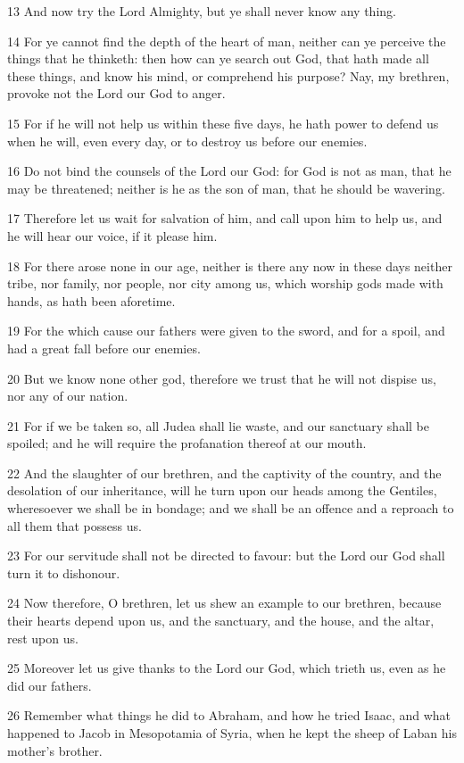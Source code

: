 \par 13 And now try the Lord Almighty, but ye shall never know any thing.
\par 14 For ye cannot find the depth of the heart of man, neither can ye perceive the things that he thinketh: then how can ye search out God, that hath made all these things, and know his mind, or comprehend his purpose? Nay, my brethren, provoke not the Lord our God to anger.
\par 15 For if he will not help us within these five days, he hath power to defend us when he will, even every day, or to destroy us before our enemies.
\par 16 Do not bind the counsels of the Lord our God: for God is not as man, that he may be threatened; neither is he as the son of man, that he should be wavering.
\par 17 Therefore let us wait for salvation of him, and call upon him to help us, and he will hear our voice, if it please him.
\par 18 For there arose none in our age, neither is there any now in these days neither tribe, nor family, nor people, nor city among us, which worship gods made with hands, as hath been aforetime.
\par 19 For the which cause our fathers were given to the sword, and for a spoil, and had a great fall before our enemies.
\par 20 But we know none other god, therefore we trust that he will not dispise us, nor any of our nation.
\par 21 For if we be taken so, all Judea shall lie waste, and our sanctuary shall be spoiled; and he will require the profanation thereof at our mouth.
\par 22 And the slaughter of our brethren, and the captivity of the country, and the desolation of our inheritance, will he turn upon our heads among the Gentiles, wheresoever we shall be in bondage; and we shall be an offence and a reproach to all them that possess us.
\par 23 For our servitude shall not be directed to favour: but the Lord our God shall turn it to dishonour.
\par 24 Now therefore, O brethren, let us shew an example to our brethren, because their hearts depend upon us, and the sanctuary, and the house, and the altar, rest upon us.
\par 25 Moreover let us give thanks to the Lord our God, which trieth us, even as he did our fathers.
\par 26 Remember what things he did to Abraham, and how he tried Isaac, and what happened to Jacob in Mesopotamia of Syria, when he kept the sheep of Laban his mother's brother.

